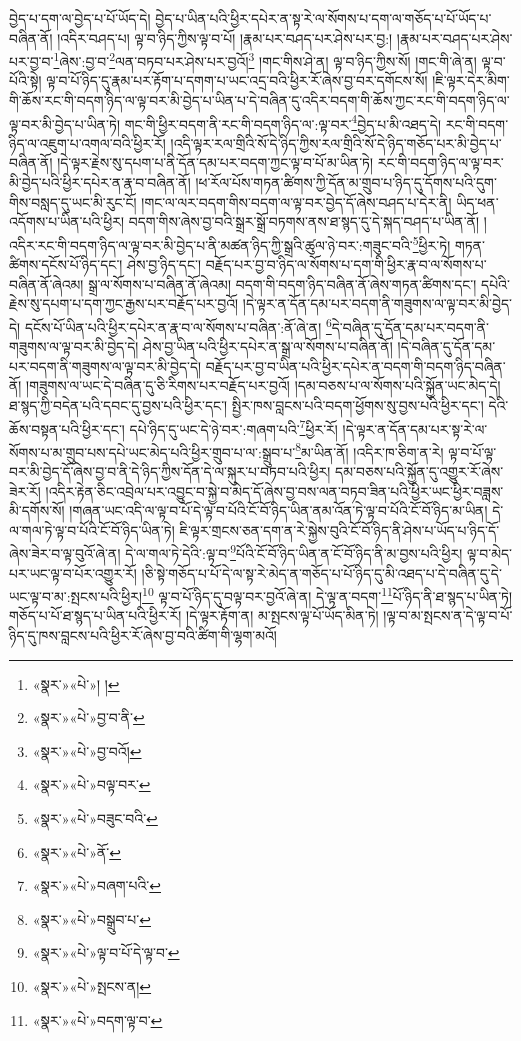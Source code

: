 བྱེད་པ་དག་ལ་བྱེད་པ་པོ་ཡོད་དེ། བྱེད་པ་ཡིན་པའི་ཕྱིར་དཔེར་ན་སྟ་རེ་ལ་སོགས་པ་དག་ལ་གཅོད་པ་པོ་ཡོད་པ་བཞིན་ནོ། །འདིར་བཤད་པ། ལྟ་བ་ཉིད་ཀྱིས་ལྟ་བ་པོ། །རྣམ་པར་བཤད་པར་ཤེས་པར་བྱ:། །རྣམ་པར་བཤད་པར་ཤེས་པར་བྱ་བ་\footnote{«སྣར་»«པེ་»། །}ཞེས་:བྱ་བ་\footnote{«སྣར་»«པེ་»བྱ་བ་ནི་}ལན་བཏབ་པར་ཤེས་པར་བྱའོ།\footnote{«སྣར་»«པེ་»བྱ་བའོ།} །གང་གིས་ཤེ་ན། ལྟ་བ་ཉིད་ཀྱིས་སོ། །གང་གི་ཞེ་ན། ལྟ་བ་པོའི་སྟེ། ལྟ་བ་པོ་ཉིད་དུ་རྣམ་པར་རྟོག་པ་དགག་པ་ཡང་འདྲ་བའི་ཕྱིར་རོ་ཞེས་བྱ་བར་དགོངས་སོ། །ཇི་ལྟར་དེར་མིག་གི་ཆོས་རང་གི་བདག་ཉིད་ལ་ལྟ་བར་མི་བྱེད་པ་ཡིན་པ་དེ་བཞིན་དུ་འདིར་བདག་གི་ཆོས་ཀྱང་རང་གི་བདག་ཉིད་ལ་ལྟ་བར་མི་བྱེད་པ་ཡིན་ཏེ། གང་གི་ཕྱིར་བདག་ནི་རང་གི་བདག་ཉིད་ལ་:ལྟ་བར་\footnote{«སྣར་»«པེ་»བལྟ་བར་}བྱེད་པ་མི་འཐད་དེ། རང་གི་བདག་ཉིད་ལ་འཇུག་པ་འགལ་བའི་ཕྱིར་རོ། །འདི་ལྟར་རལ་གྲིའི་སོ་དེ་ཉིད་ཀྱིས་རལ་གྲིའི་སོ་དེ་ཉིད་གཅོད་པར་མི་བྱེད་པ་བཞིན་ནོ། །དེ་ལྟར་རྗེས་སུ་དཔག་པ་ནི་དོན་དམ་པར་བདག་ཀྱང་ལྟ་བ་པོ་མ་ཡིན་ཏེ། རང་གི་བདག་ཉིད་ལ་ལྟ་བར་མི་བྱེད་པའི་ཕྱིར་དཔེར་ན་རྣ་བ་བཞིན་ནོ། །ཕ་རོལ་པོས་གཏན་ཚིགས་ཀྱི་དོན་མ་གྲུབ་པ་ཉིད་དུ་དོགས་པའི་དུག་གིས་བསླད་དུ་ཡང་མི་རུང་ངོ། །གང་ལ་ལར་བདག་གིས་བདག་ལ་ལྟ་བར་བྱེད་དོ་ཞེས་བཤད་པ་དེར་ནི། ཡིད་ཕན་འདོགས་པ་ཡིན་པའི་ཕྱིར། བདག་གིས་ཞེས་བྱ་བའི་སྒྲར་སྒྲོ་བཏགས་ནས་ཐ་སྙད་དུ་དེ་སྐད་བཤད་པ་ཡིན་ནོ། །འདིར་རང་གི་བདག་ཉིད་ལ་ལྟ་བར་མི་བྱེད་པ་ནི་མཚན་ཉིད་ཀྱི་སྒྲའི་ཚུལ་ཉེ་བར་:གཟུང་བའི་\footnote{«སྣར་»«པེ་»བཟུང་བའི་}ཕྱིར་ཏེ། གཏན་ཚིགས་དངོས་པོ་ཉིད་དང་། ཤེས་བྱ་ཉིད་དང་། བརྗོད་པར་བྱ་བ་ཉིད་ལ་སོགས་པ་དག་གི་ཕྱིར་རྣ་བ་ལ་སོགས་པ་བཞིན་ནོ་ཞེའམ། སྒྲ་ལ་སོགས་པ་བཞིན་ནོ་ཞེའམ། བདག་གི་བདག་ཉིད་བཞིན་ནོ་ཞེས་གཏན་ཚིགས་དང་། དཔེའི་རྗེས་སུ་དཔག་པ་དག་ཀྱང་རྒྱས་པར་བརྗོད་པར་བྱའོ། །དེ་ལྟར་ན་དོན་དམ་པར་བདག་ནི་གཟུགས་ལ་ལྟ་བར་མི་བྱེད་དེ། དངོས་པོ་ཡིན་པའི་ཕྱིར་དཔེར་ན་རྣ་བ་ལ་སོགས་པ་བཞིན་:ནོ་ཞེ་ན། \footnote{«སྣར་»«པེ་»ནོ་}དེ་བཞིན་དུ་དོན་དམ་པར་བདག་ནི་གཟུགས་ལ་ལྟ་བར་མི་བྱེད་དེ། ཤེས་བྱ་ཡིན་པའི་ཕྱིར་དཔེར་ན་སྒྲ་ལ་སོགས་པ་བཞིན་ནོ། །དེ་བཞིན་དུ་དོན་དམ་པར་བདག་ནི་གཟུགས་ལ་ལྟ་བར་མི་བྱེད་དེ། བརྗོད་པར་བྱ་བ་ཡིན་པའི་ཕྱིར་དཔེར་ན་བདག་གི་བདག་ཉིད་བཞིན་ནོ། །གཟུགས་ལ་ཡང་དེ་བཞིན་དུ་ཅི་རིགས་པར་བརྗོད་པར་བྱའོ། །དམ་བཅས་པ་ལ་སོགས་པའི་སྐྱོན་ཡང་མེད་དེ། ཐ་སྙད་ཀྱི་བདེན་པའི་དབང་དུ་བྱས་པའི་ཕྱིར་དང་། སྤྱིར་ཁས་བླངས་པའི་བདག་ཕྱོགས་སུ་བྱས་པའི་ཕྱིར་དང་། དེའི་ཆོས་བསྟན་པའི་ཕྱིར་དང་། དཔེ་ཉིད་དུ་ཡང་དེ་ཉེ་བར་:གཞག་པའི་\footnote{«སྣར་»«པེ་»བཞག་པའི་}ཕྱིར་རོ། །དེ་ལྟར་ན་དོན་དམ་པར་སྟ་རེ་ལ་སོགས་པ་མ་གྲུབ་པས་དཔེ་ཡང་མེད་པའི་ཕྱིར་གྲུབ་པ་ལ་:སྒྲུབ་པ་\footnote{«སྣར་»«པེ་»བསྒྲུབ་པ་}མ་ཡིན་ནོ། །འདིར་ཁ་ཅིག་ན་རེ། ལྟ་བ་པོ་ལྟ་བར་མི་བྱེད་དོ་ཞེས་བྱ་བ་ནི་དེ་ཉིད་ཀྱིས་དོན་དེ་ལ་སྐུར་པ་བཏབ་པའི་ཕྱིར། དམ་བཅས་པའི་སྐྱོན་དུ་འགྱུར་རོ་ཞེས་ཟེར་རོ། །འདིར་རྟེན་ཅིང་འབྲེལ་པར་འབྱུང་བ་སྐྱེ་བ་མེད་དོ་ཞེས་བྱ་བས་ལན་བཏབ་ཟིན་པའི་ཕྱིར་ཡང་ཕྱིར་བཟླས་མི་དགོས་སོ། །གཞན་ཡང་འདི་ལ་ལྟ་བ་པོ་དེ་ལྟ་བ་པོའི་ངོ་བོ་ཉིད་ཡིན་ནམ་འོན་ཏེ་ལྟ་བ་པོའི་ངོ་བོ་ཉིད་མ་ཡིན། དེ་ལ་གལ་ཏེ་ལྟ་བ་པོའི་ངོ་བོ་ཉིད་ཡིན་ཏེ། ཇི་ལྟར་གྲངས་ཅན་དག་ན་རེ་སྐྱེས་བུའི་ངོ་བོ་ཉིད་ནི་ཤེས་པ་ཡོད་པ་ཉིད་དོ་ཞེས་ཟེར་བ་ལྟ་བུའོ་ཞེ་ན། དེ་ལ་གལ་ཏེ་དེའི་:ལྟ་བ་\footnote{«སྣར་»«པེ་»ལྟ་བ་པོ་དེ་ལྟ་བ་}པོའི་ངོ་བོ་ཉིད་ཡིན་ན་ངོ་བོ་ཉིད་ནི་མ་བྱས་པའི་ཕྱིར། ལྟ་བ་མེད་པར་ཡང་ལྟ་བ་པོར་འགྱུར་རོ། །ཅི་སྟེ་གཅོད་པ་པོ་དེ་ལ་སྟ་རེ་མེད་ན་གཅོད་པ་པོ་ཉིད་དུ་མི་འཐད་པ་དེ་བཞིན་དུ་དེ་ཡང་ལྟ་བ་མ་:སྤངས་པའི་ཕྱིར།\footnote{«སྣར་»«པེ་»སྤངས་ན།} ལྟ་བ་པོ་ཉིད་དུ་བལྟ་བར་བྱའོ་ཞེ་ན། དེ་ལྟ་ན་བདག་\footnote{«སྣར་»«པེ་»བདག་ལྟ་བ་}པོ་ཉིད་ནི་ཐ་སྙད་པ་ཡིན་ཏེ། གཅོད་པ་པོ་ཐ་སྙད་པ་ཡིན་པའི་ཕྱིར་རོ། །དེ་ལྟར་རྟོག་ན། མ་སྤངས་ལྟ་པོ་ཡོད་མིན་ཏེ། །ལྟ་བ་མ་སྤངས་ན་དེ་ལྟ་བ་པོ་ཉིད་དུ་ཁས་བླངས་པའི་ཕྱིར་རོ་ཞེས་བྱ་བའི་ཚིག་གི་ལྷག་མའོ། 